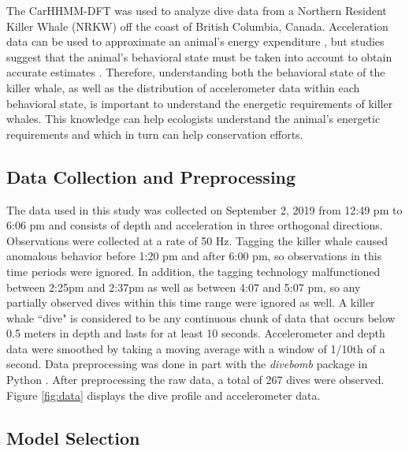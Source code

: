 

The CarHHMM-DFT was used to analyze dive data from a Northern Resident Killer Whale (NRKW) off the coast of British Columbia, Canada. Acceleration data can be used to approximate an animal's energy expenditure \citep{Green:2009}, but studies suggest that the animal's behavioral state must be taken into account to obtain accurate estimates \citep{Dot:2016}. Therefore, understanding both the behavioral state of the killer whale, as well as the distribution of accelerometer data within each behavioral state, is important to understand the energetic requirements of killer whales. This knowledge can help ecologists understand the animal's energetic requirements and which in turn can help conservation efforts.

\subsection{Data Collection and Preprocessing}

The data used in this study was collected on September 2, 2019 from 12:49 pm to 6:06 pm and consists of depth and acceleration in three orthogonal directions. Observations were collected at a rate of 50 Hz. Tagging the killer whale caused anomalous behavior before 1:20 pm and after 6:00 pm, so observations in this time periods were ignored. In addition, the tagging technology malfunctioned between 2:25pm and 2:37pm as well as between 4:07 and 5:07 pm, so any partially observed dives within this time range were ignored as well. A killer whale ``dive" is considered to be any continuous chunk of data that occurs below 0.5 meters in depth and lasts for at least 10 seconds. Accelerometer and depth data were smoothed by taking a moving average with a window of 1/10th of a second. Data preprocessing was done in part with the \textit{divebomb} package in Python \citep{Nunes:2018}. After preprocessing the raw data, a total of 267 dives were observed. Figure \ref{fig:data} displays the dive profile and accelerometer data.

\subsection{Model Selection}

